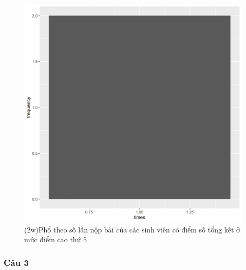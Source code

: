 \documentclass[a4paper]{article}
\theoremstyle{definition}
\begin{document}
\begin{figure}[!ht]
    \centering
    \includegraphics[scale=0.4]{Pics/q2w-5-file3.png}
    \caption{(2w)Phổ theo số lần nộp bài của các sinh viên có điểm số tổng kết ở mức điểm cao thứ $5$}
    \label{fig:my_label}
\end{figure}
\newpage
\subsubsection{Câu 3}
\end{document}
